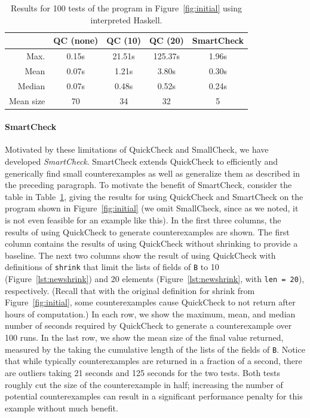 \documentclass[10pt]{sigplanconf}
\newcommand{\ttp}[1]{\texttt{#1}}
\begin{document}
\begin{table}[ht]
\footnotesize
  \begin{center}
    \begin{tabular}{|r||c|c|c|c|}
\hline
 & QC (none) & QC (10) & QC (20) & SmartCheck \\
\hline \hline
Max.  & 0.15s & 21.51s & 125.37s & 1.96s\\
\hline
Mean  & 0.07s & 1.21s & 3.80s & 0.30s\\
\hline
Median & 0.07s & 0.48s & 0.52s & 0.24s\\
\hline
Mean size & 70 & 34 & 32 & 5\\
\hline
    \end{tabular}
  \end{center}
  \caption{Results for 100 tests of the program in Figure~\ref{fig:initial}
    using interpreted Haskell.}
  \label{table:results}
\end{table}


\paragraph{SmartCheck}
Motivated by these limitations of QuickCheck and SmallCheck, we have developed
\emph{SmartCheck}.  SmartCheck extends QuickCheck to efficiently and generically
find small counterexamples as well as generalize them as described in the
preceding paragraph.  To motivate the benefit of SmartCheck, consider the table
in Table~\ref{table:results}, giving the results for using QuickCheck and
SmartCheck on the program shown in Figure~\ref{fig:initial} (we omit SmallCheck,
since as we noted, it is not even feasible for an example like this).  In the
first three columns, the results of using QuickCheck to generate counterexamples
are shown.  The first column contains the results of using QuickCheck without
shrinking to provide a baseline.  The next two columns show the result of using
QuickCheck with definitions of \ttp{shrink} that limit the lists of fields of
\ttp{B} to 10 (Figure~\ref{lst:newshrink}) and 20 elements
(Figure~\ref{lst:newshrink}, with \ttp{len = 20}), respectively.  (Recall that
with the original definition for shrink from Figure~\ref{fig:initial}, some
counterexamples cause QuickCheck to not return after hours of computation.)  In
each row, we show the maximum, mean, and median number of seconds required by
QuickCheck to generate a counterexample over 100 runs.  In the last row, we show
the mean size of the final value returned, measured by the taking the cumulative
length of the lists of the fields of \ttp{B}.  Notice that while typically
counterexamples are returned in a fraction of a second, there are outliers
taking 21 seconds and 125 seconds for the two tests.  Both tests roughly cut the
size of the counterexample in half; increasing the number of potential
counterexamples can result in a significant performance penalty for this example
without much benefit.
\end{document}
